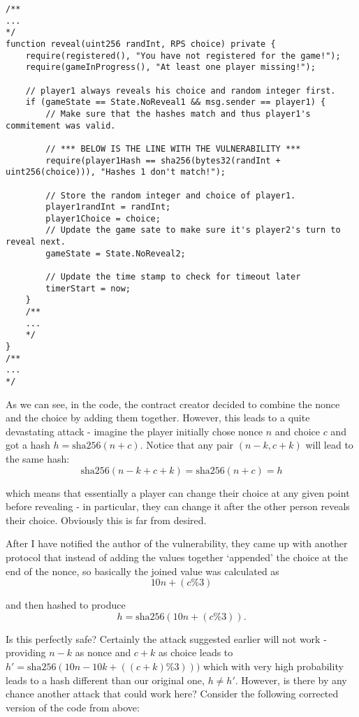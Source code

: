 \documentclass{article}
\begin{document}
    \begin{lstlisting}[language=Solidity]
/**
...
*/
function reveal(uint256 randInt, RPS choice) private {
    require(registered(), "You have not registered for the game!");
    require(gameInProgress(), "At least one player missing!");

    // player1 always reveals his choice and random integer first.
    if (gameState == State.NoReveal1 && msg.sender == player1) {
        // Make sure that the hashes match and thus player1's commitement was valid.

        // *** BELOW IS THE LINE WITH THE VULNERABILITY ***
        require(player1Hash == sha256(bytes32(randInt + uint256(choice))), "Hashes 1 don't match!");

        // Store the random integer and choice of player1.
        player1randInt = randInt;
        player1Choice = choice;
        // Update the game sate to make sure it's player2's turn to reveal next.
        gameState = State.NoReveal2;

        // Update the time stamp to check for timeout later
        timerStart = now;
    }
    /**
    ...
    */
}
/**
...
*/
    \end{lstlisting}

    \noindent As we can see, in the code, the contract
    creator decided to combine the nonce and the choice by
    adding them together. However, this leads to a quite
    devastating attack - imagine the player initially chose
    nonce \(n\) and choice \(c\) and got a hash \(h =
    \text{sha256}(n + c)\). Notice that any pair
    \((n-k,c+k)\) will lead to the same hash:
    \[
       \text{sha256}(n-k+c+k) = \text{sha256}(n+c) = h 
    \]

    \noindent which means that essentially a player can
    change their choice at any given point before revealing
    - in particular, they can change it after the other
    person reveals their choice. Obviously this is far from
    desired.
    \newline

    \noindent After I have notified the author of the
    vulnerability, they came up with another protocol that
    instead of adding the values together `appended' the
    choice at the end of the nonce, so basically the joined
    value was calculated as
    \[
        10n + (c\%3)
    \]

    \noindent and then hashed to produce
    \[
        h = \text{sha256}(10n + (c\%3)).
    \]

    \noindent Is this perfectly safe? Certainly the attack
    suggested earlier will not work - providing \(n - k\) as
    nonce and \(c + k\) as choice leads to \(h' =
    \text{sha256}(10n - 10k + ((c + k) \% 3)))\) which with
    very high probability leads to a hash different than our
    original one, \(h \neq h'\). However, is there by any
    chance another attack that could work here? Consider the
    following corrected version of the code from above:
\end{document}
